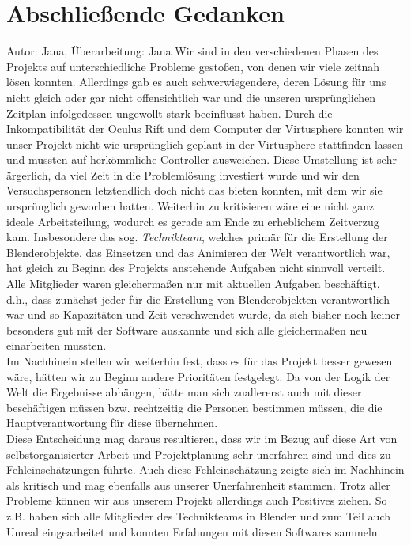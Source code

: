 \documentclass{Bericht}
\begin{document}
	


\section{Abschließende Gedanken} %
Autor: Jana, Überarbeitung: Jana
	Wir sind in den verschiedenen Phasen des Projekts auf unterschiedliche Probleme gestoßen, von denen wir viele zeitnah lösen konnten. Allerdings gab es auch schwerwiegendere, deren Lösung für uns nicht gleich oder gar nicht offensichtlich war und die unseren ursprünglichen Zeitplan infolgedessen ungewollt stark beeinflusst haben.
	Durch die Inkompatibilität der Oculus Rift und dem Computer der Virtusphere konnten wir unser Projekt nicht wie ursprünglich geplant in der Virtusphere stattfinden lassen und mussten auf herkömmliche Controller ausweichen. Diese Umstellung ist sehr ärgerlich, da viel Zeit in die Problemlösung investiert wurde und wir den Versuchspersonen letztendlich doch nicht das bieten konnten, mit dem wir sie ursprünglich geworben hatten. 
Weiterhin zu kritisieren wäre eine nicht ganz ideale Arbeitsteilung, wodurch es gerade am Ende zu erheblichem Zeitverzug kam. Insbesondere das sog. \textit{Technikteam}, welches primär für die Erstellung der Blenderobjekte, das Einsetzen und das Animieren der Welt verantwortlich war, hat gleich zu Beginn des Projekts anstehende Aufgaben nicht sinnvoll verteilt. Alle Mitglieder waren gleichermaßen nur mit aktuellen Aufgaben beschäftigt, d.h., dass zunächst jeder für die Erstellung von Blenderobjekten verantwortlich war und so Kapazitäten und Zeit verschwendet wurde, da sich bisher noch keiner besonders gut mit der Software auskannte und sich alle gleichermaßen neu einarbeiten mussten. \\ 
Im Nachhinein stellen wir weiterhin fest, dass es für das Projekt besser gewesen wäre, hätten wir zu Beginn andere Prioritäten festgelegt. Da von der Logik der Welt die Ergebnisse abhängen, hätte man sich zuallererst auch mit dieser beschäftigen müssen bzw. rechtzeitig die Personen bestimmen müssen, die die Hauptverantwortung für diese übernehmen.\\
Diese Entscheidung mag daraus resultieren, dass wir im Bezug auf diese Art von selbstorganisierter Arbeit und Projektplanung sehr unerfahren sind und dies zu Fehleinschätzungen führte.
Auch diese Fehleinschätzung zeigte sich im Nachhinein als kritisch und mag ebenfalls aus unserer Unerfahrenheit stammen.
	Trotz aller Probleme können wir aus unserem Projekt allerdings auch Positives ziehen. So z.B. haben sich alle Mitglieder des Technikteams in Blender und zum Teil auch Unreal eingearbeitet und konnten Erfahungen mit diesen Softwares sammeln.\\
\end{document}

